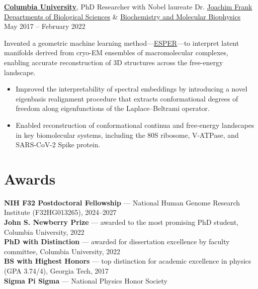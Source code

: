 \documentclass[11pt]{article}
\begin{document}
\textbf{\href{https://www.columbia.edu/}{Columbia University}}, PhD Researcher with Nobel laureate Dr. \href{https://www.nobelprize.org/prizes/chemistry/2017/frank}{Joachim Frank}\\
\href{https://biology.columbia.edu/}{Departments of Biological Sciences} \& \href{https://www.biochem.cuimc.columbia.edu/}{Biochemistry and Molecular Biophysics} \hfill May 2017 – February 2022

\small{
Invented a geometric machine learning method—\href{https://ieeexplore.ieee.org/document/9773954}{ESPER}—to interpret latent manifolds derived from cryo-EM ensembles of macromolecular complexes, enabling accurate reconstruction of 3D structures across the free-energy landscape.

    \begin{itemize}
        \item Improved the interpretability of spectral embeddings by introducing a novel eigenbasis realignment procedure that extracts conformational degrees of freedom along eigenfunctions of the Laplace–Beltrami operator.
        \item Enabled reconstruction of conformational continua and free-energy landscapes in key biomolecular systems, including the 80S ribosome, V-ATPase, and SARS-CoV-2 Spike protein.
    \end{itemize}
}


\section*{\textcolor{Mahogany}{Awards}}
{\small
\textbf{NIH F32 Postdoctoral Fellowship} — National Human Genome Research Institute (F32HG013265), 2024–2027\\
\textbf{John S. Newberry Prize} — awarded to the most promising PhD student, Columbia University, 2022\\
\textbf{PhD with Distinction} — awarded for dissertation excellence by faculty committee, Columbia University, 2022\\
\textbf{BS with Highest Honors} — top distinction for academic excellence in physics (GPA 3.74/4), Georgia Tech, 2017\\
\textbf{Sigma Pi Sigma} — National Physics Honor Society
}
\end{document}
